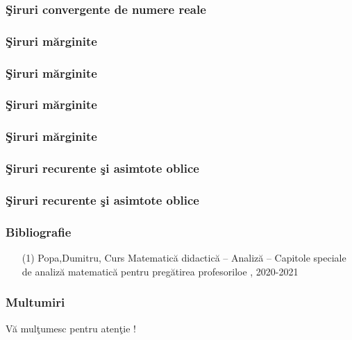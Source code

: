 \documentclass{beamer}
\theoremstyle{plain}
\begin{document}
\frame
{
\frametitle{\c Siruri convergente de numere reale}

}
\frame
{
\frametitle{\c Siruri m\u arginite}

}
\frame
{
\frametitle{\c Siruri m\u arginite}

}
\frame
{
\frametitle{\c Siruri m\u arginite}

}
\frame
{
\frametitle{\c Siruri m\u arginite}

}
\frame
{
\frametitle{\c Siruri recurente \c si asimtote oblice}

}
\frame
{
\frametitle{\c Siruri recurente \c si asimtote oblice}

}

\frame
{
\frametitle{Bibliografie}
\begin{itemize}
\item[(1)] Popa,Dumitru, Curs Matematică didactică – Analiză – Capitole speciale de analiză matematică pentru pregătirea profesoriloe , 2020-2021
\end{itemize}
}
\frame
{\frametitle{Multumiri}
\begin{center}
{\Large V\u a mul\c tumesc pentru aten\c tie !}	
\end{center}
}
\end{document}
